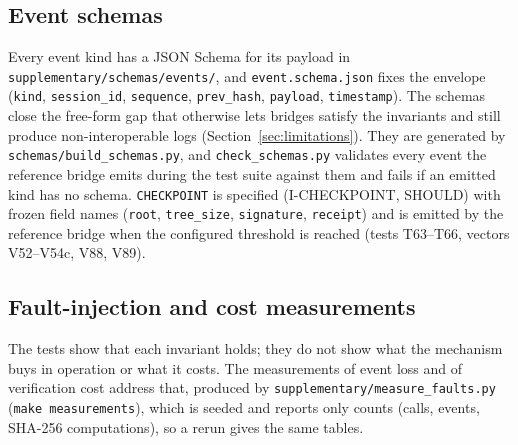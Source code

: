 

\subsection{Event schemas}\label{sec:schemas}

Every event kind has a JSON Schema for its payload in
\texttt{supplementary/schemas/events/}, and \texttt{event.schema.json}
fixes the envelope (\texttt{kind}, \texttt{session\_id}, \texttt{sequence},
\texttt{prev\_hash}, \texttt{payload}, \texttt{timestamp}). The schemas close
the free-form gap that otherwise lets bridges satisfy the invariants and
still produce non-interoperable logs (Section~\ref{sec:limitations}). They
are generated by \texttt{schemas/build\_schemas.py}, and
\texttt{check\_schemas.py} validates every event the reference bridge emits
during the test suite against them and fails if an emitted kind has no
schema. \texttt{CHECKPOINT} is specified (I-CHECKPOINT, SHOULD) with
frozen field names (\texttt{root}, \texttt{tree\_size},
\texttt{signature}, \texttt{receipt}) and is emitted by the
reference bridge when the configured threshold is reached
(tests T63--T66, vectors V52--V54c, V88, V89).

\subsection{Fault-injection and cost measurements}\label{sec:measurements}

The tests show that each invariant holds; they do not show what the
mechanism buys in operation or what it costs. The measurements of event loss and of verification cost address
that, produced by \texttt{supplementary/measure\_faults.py}
(\texttt{make measurements}), which is seeded and reports only counts
(calls, events, SHA-256 computations), so a rerun gives the same tables.

